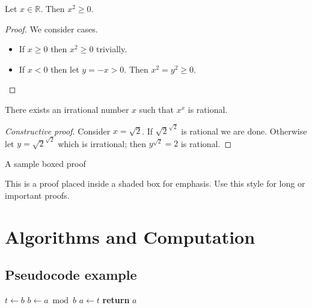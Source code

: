 \documentclass[12pt,oneside]{book}
\newcounter{subproof}
\newcommand{\R}{\mathbb{R}}
\begin{document}
\begin{theorem}
Let $x\in\R$. Then $x^2\ge 0$.
\end{theorem}
\begin{proof}
We consider cases.
\begin{itemize}
  \item If $x\ge 0$ then $x^2\ge 0$ trivially.
  \item If $x<0$ then let $y=-x>0$. Then $x^2=y^2\ge 0$.
\end{itemize}
\end{proof}

\begin{theorem}
There exists an irrational number $x$ such that $x^x$ is rational.
\end{theorem}
\begin{proof}[Constructive proof]
Consider $x=\sqrt{2}$. If $\sqrt{2}^{\sqrt{2}}$ is rational we are done. Otherwise let $y=\sqrt{2}^{\sqrt{2}}$ which is irrational; then $y^{\sqrt{2}}=2$ is rational.
\end{proof}

\begin{theorem}
A sample boxed proof
\end{theorem}
\begin{boxedproof}
This is a proof placed inside a shaded box for emphasis. Use this style for long or important proofs.
\end{boxedproof}

\chapter{Algorithms and Computation}
\section{Pseudocode example}
\begin{algorithm}
\caption{Euclid's algorithm for gcd}
\begin{algorithmic}[1]
    \State $t\gets b$
    \State $b\gets a \bmod b$
    \State $a\gets t$
  \EndWhile
  \State \textbf{return} $a$
\EndProcedure
\end{algorithmic}
\end{algorithm}
\end{document}
